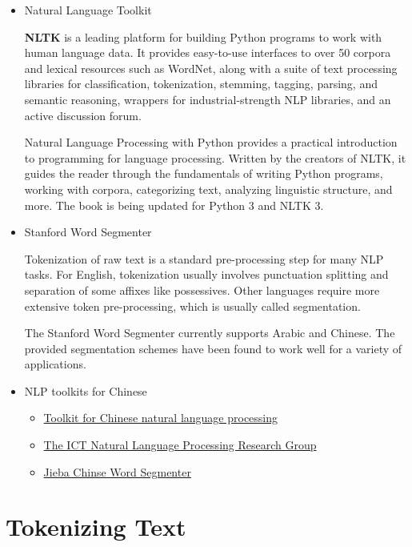 \documentclass{article}
\begin{document}
\begin{itemize}
\item
  Natural Language Toolkit

  \textbf{NLTK} is a leading platform for building Python programs to
  work with human language data. It provides easy-to-use interfaces to
  over 50 corpora and lexical resources such as WordNet, along with a
  suite of text processing libraries for classification, tokenization,
  stemming, tagging, parsing, and semantic reasoning, wrappers for
  industrial-strength NLP libraries, and an active discussion forum.

  Natural Language Processing with Python provides a practical
  introduction to programming for language processing. Written by the
  creators of NLTK, it guides the reader through the fundamentals of
  writing Python programs, working with corpora, categorizing text,
  analyzing linguistic structure, and more. The book is being updated
  for Python 3 and NLTK 3.
\item
  Stanford Word Segmenter

  Tokenization of raw text is a standard pre-processing step for many
  NLP tasks. For English, tokenization usually involves punctuation
  splitting and separation of some affixes like possessives. Other
  languages require more extensive token pre-processing, which is
  usually called segmentation.

  The Stanford Word Segmenter currently supports Arabic and Chinese. The
  provided segmentation schemes have been found to work well for a
  variety of applications.
\item
  NLP toolkits for Chinese

  \begin{itemize}
  \item
    \href{https://github.com/xpqiu/fnlp/}{Toolkit for Chinese natural
    language processing}
  \item
    \href{http://nlp.ict.ac.cn/english/}{The ICT Natural Language
    Processing Research Group}
  \item
    \href{https://github.com/fxsjy/jieba}{Jieba Chinse Word Segmenter}
  \end{itemize}
\end{itemize}

    \section{Tokenizing Text}\label{tokenizing-text}
\end{document}
